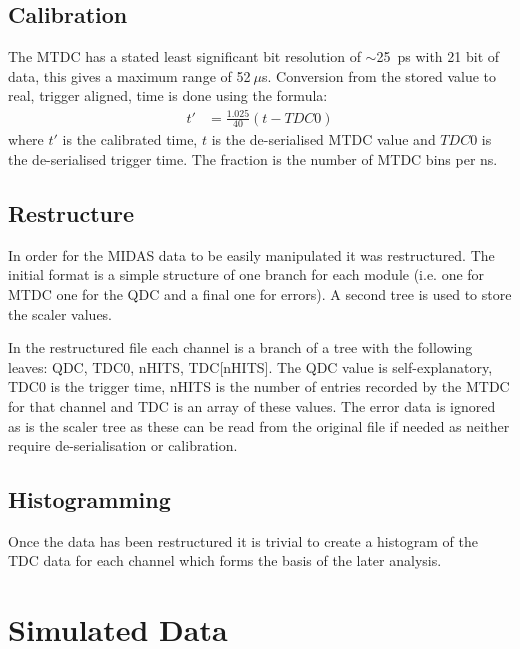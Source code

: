 \documentclass[]{article}
\newcommand{\ms}{$~\mu$s}
\begin{document}
\subsection{Calibration} %
\label{sub:calibration}
The MTDC has a stated least significant bit resolution of $\sim$25~ps with 21 bit of data, this gives a maximum range of 52\ms{}. Conversion from the stored value to real, trigger aligned, time is done using the formula:
\begin{align}\label{equ:tdc_calibration}
	t'   &= \frac{1.025}{40}(t - TDC0)
\end{align}
where $t'$ is the calibrated time, $t$ is the de-serialised MTDC value and $TDC0$ is the de-serialised trigger time. The fraction is the number of MTDC bins per ns.
\subsection{Restructure} %
\label{sub:restructure}
In order for the MIDAS data to be easily manipulated it was restructured. The initial format is a simple structure of one branch for each module (i.e. one for MTDC one for the QDC and a final one for errors). A second tree is used to store the scaler values. 

In the restructured file each channel is a branch of a tree with the following leaves: QDC, TDC0, nHITS, TDC[nHITS]. The QDC value is self-explanatory, TDC0 is the trigger time, nHITS is the number of entries recorded by the MTDC for that channel and TDC is an array of these values. The error data is ignored as is the scaler tree as these can be read from the original file if needed as neither require de-serialisation or calibration.
\subsection{Histogramming} %
\label{sub:Histogramming}
Once the data has been restructured it is trivial to create a histogram of the TDC data for each channel which forms the basis of the later analysis.
\section{Simulated Data} %
\label{sec:simulated_data}

\end{document}
